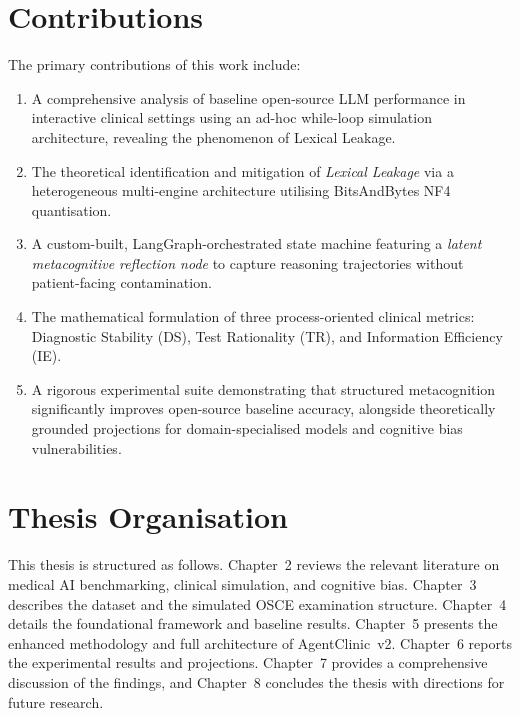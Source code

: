 \section{Contributions}

The primary contributions of this work include:
\begin{enumerate}
    \item A comprehensive analysis of baseline open-source LLM performance in interactive clinical settings using an ad-hoc while-loop simulation architecture, revealing the phenomenon of Lexical Leakage.
    \item The theoretical identification and mitigation of \textit{Lexical Leakage} via a heterogeneous multi-engine architecture utilising BitsAndBytes NF4 quantisation.
    \item A custom-built, LangGraph-orchestrated state machine featuring a \textit{latent metacognitive reflection node} to capture reasoning trajectories without patient-facing contamination.
    \item The mathematical formulation of three process-oriented clinical metrics: Diagnostic Stability (DS), Test Rationality (TR), and Information Efficiency (IE).
    \item A rigorous experimental suite demonstrating that structured metacognition significantly improves open-source baseline accuracy, alongside theoretically grounded projections for domain-specialised models and cognitive bias vulnerabilities.
\end{enumerate}

\section{Thesis Organisation}

This thesis is structured as follows. Chapter~2 reviews the relevant literature on medical AI benchmarking, clinical simulation, and cognitive bias. Chapter~3 describes the dataset and the simulated OSCE examination structure. Chapter~4 details the foundational framework and baseline results. Chapter~5 presents the enhanced methodology and full architecture of AgentClinic~v2. Chapter~6 reports the experimental results and projections. Chapter~7 provides a comprehensive discussion of the findings, and Chapter~8 concludes the thesis with directions for future research.
